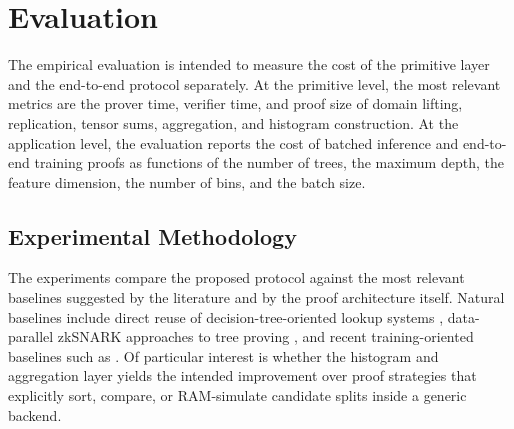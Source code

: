 \section{Evaluation}

The empirical evaluation is intended to measure the cost of the primitive layer
and the end-to-end protocol separately. At the primitive level, the most
relevant metrics are the prover time, verifier time, and proof size of domain
lifting, replication, tensor sums, aggregation, and histogram construction. At
the application level, the evaluation reports the cost of batched inference and
end-to-end training proofs as functions of the number of trees, the maximum
depth, the feature dimension, the number of bins, and the batch size.

\subsection{Experimental Methodology}

The experiments compare the proposed protocol against the most relevant
baselines suggested by the literature and by the proof architecture itself.
Natural baselines include direct reuse of decision-tree-oriented lookup systems
\cite{cq++24}, data-parallel zkSNARK approaches to tree proving
\cite{sparrow24}, and recent training-oriented baselines such as
\cite{zkboost26}. Of particular interest is whether the histogram and
aggregation layer yields the intended improvement over proof strategies that
explicitly sort, compare, or RAM-simulate candidate splits inside a generic
backend.
